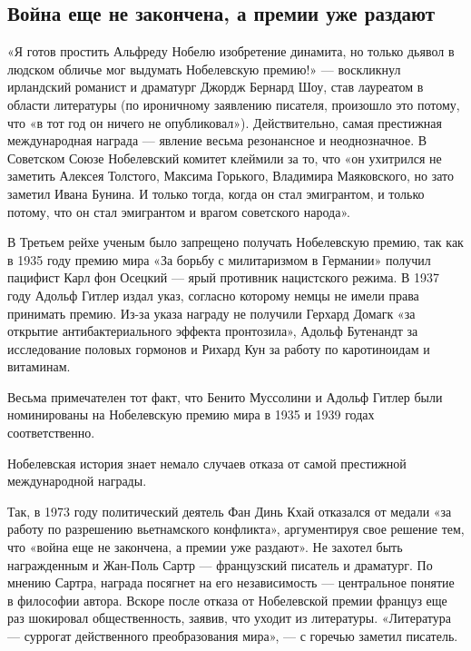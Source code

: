 \subsection{Война еще не закончена, а премии уже раздают}
«Я готов простить Альфреду Нобелю изобретение динамита, но только дьявол в людском обличье мог выдумать Нобелевскую премию!» --- воскликнул ирландский романист и драматург Джордж Бернард Шоу, став лауреатом в области литературы (по ироничному заявлению писателя, произошло это потому, что «в тот год он ничего не опубликовал»). Действительно, самая престижная международная награда --- явление весьма резонансное и неоднозначное. В Советском Союзе Нобелевский комитет клеймили за то, что «он ухитрился не заметить Алексея Толстого, Максима Горького, Владимира Маяковского, но зато заметил Ивана Бунина. И только тогда, когда он стал эмигрантом, и только потому, что он стал эмигрантом и врагом советского народа».

В Третьем рейхе ученым было запрещено получать Нобелевскую премию, так как в 1935 году премию мира «За борьбу с милитаризмом в Германии» получил пацифист Карл фон Осецкий --- ярый противник нацистского режима. В 1937 году Адольф Гитлер издал указ, согласно которому немцы не имели права принимать премию. Из-за указа награду не получили Герхард Домагк «за открытие антибактериального эффекта пронтозила», Адольф Бутенандт за исследование половых гормонов и Рихард Кун за работу по каротиноидам и витаминам.


\begin{fancyquotes}
    Весьма примечателен тот факт, что Бенито Муссолини и Адольф Гитлер были номинированы на Нобелевскую премию мира в 1935 и 1939 годах соответственно.
\end{fancyquotes}

Нобелевская история знает немало случаев отказа от самой престижной международной награды.

Так, в 1973 году политический деятель Фан Динь Кхай отказался от медали «за работу по разрешению вьетнамского конфликта», аргументируя свое решение тем, что «война еще не закончена, а премии уже раздают». Не захотел быть награжденным и Жан-Поль Сартр --- французский писатель и драматург. По мнению Сартра, награда посягнет на его независимость --- центральное понятие в философии автора. Вскоре после отказа от Нобелевской премии француз еще раз шокировал общественность, заявив, что уходит из литературы. «Литература --- суррогат действенного преобразования мира», --- с горечью заметил писатель.

